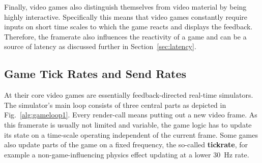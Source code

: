
Finally, video games also distinguish themselves from video material by being highly interactive. Specifically this means that video games constantly require inputs on short time scales to which the game reacts and displays the feedback. Therefore, the framerate also influences the reactivity of a game and can be a source of latency as discussed further in Section~\ref{sec:latency}.


\subsection{Game Tick Rates and Send Rates}

At their core video games are essentially feedback-directed real-time simulators. The simulator's main loop consists of three central parts as depicted in Fig.~\ref{alg:gameloop1}. Every render-call means putting out a new video frame. As this framerate is usually not limited and variable, the game logic has to update its state on a time-scale operating independent of the current frame. Some games also update parts of the game on a fixed frequency, the so-called \textbf{tickrate}, for example a non-game-influencing physics effect updating at a lower \SI{30}{\hertz} rate.

